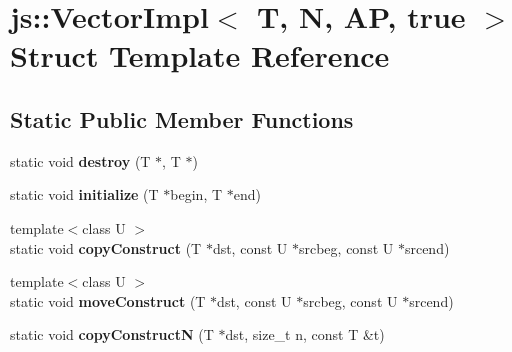 \hypertarget{structjs_1_1_vector_impl_3_01_t_00_01_n_00_01_a_p_00_01true_01_4}{\section{js\-:\-:Vector\-Impl$<$ T, N, A\-P, true $>$ Struct Template Reference}
\label{structjs_1_1_vector_impl_3_01_t_00_01_n_00_01_a_p_00_01true_01_4}
}
\subsection*{Static Public Member Functions}
\begin{DoxyCompactItemize}
\item 
\hypertarget{structjs_1_1_vector_impl_3_01_t_00_01_n_00_01_a_p_00_01true_01_4_a577c31b6f9adbd398ef9756cd1945482}{static void {\bfseries destroy} (T $\ast$, T $\ast$)}\label{structjs_1_1_vector_impl_3_01_t_00_01_n_00_01_a_p_00_01true_01_4_a577c31b6f9adbd398ef9756cd1945482}

\item 
\hypertarget{structjs_1_1_vector_impl_3_01_t_00_01_n_00_01_a_p_00_01true_01_4_af8c4b379a68282deb09405e1a3fcbe27}{static void {\bfseries initialize} (T $\ast$begin, T $\ast$end)}\label{structjs_1_1_vector_impl_3_01_t_00_01_n_00_01_a_p_00_01true_01_4_af8c4b379a68282deb09405e1a3fcbe27}

\item 
\hypertarget{structjs_1_1_vector_impl_3_01_t_00_01_n_00_01_a_p_00_01true_01_4_a380614a3aaa1e3cb23a2c6343d90dcc5}{{\footnotesize template$<$class U $>$ }\\static void {\bfseries copy\-Construct} (T $\ast$dst, const U $\ast$srcbeg, const U $\ast$srcend)}\label{structjs_1_1_vector_impl_3_01_t_00_01_n_00_01_a_p_00_01true_01_4_a380614a3aaa1e3cb23a2c6343d90dcc5}

\item 
\hypertarget{structjs_1_1_vector_impl_3_01_t_00_01_n_00_01_a_p_00_01true_01_4_a13d72042407d1e1bbbc80bb20aadd0ab}{{\footnotesize template$<$class U $>$ }\\static void {\bfseries move\-Construct} (T $\ast$dst, const U $\ast$srcbeg, const U $\ast$srcend)}\label{structjs_1_1_vector_impl_3_01_t_00_01_n_00_01_a_p_00_01true_01_4_a13d72042407d1e1bbbc80bb20aadd0ab}

\item 
\hypertarget{structjs_1_1_vector_impl_3_01_t_00_01_n_00_01_a_p_00_01true_01_4_a1e9cbf9e686058634877baaaaea68762}{static void {\bfseries copy\-Construct\-N} (T $\ast$dst, size\-\_\-t n, const T \&t)}\label{structjs_1_1_vector_impl_3_01_t_00_01_n_00_01_a_p_00_01true_01_4_a1e9cbf9e686058634877baaaaea68762}


\end{DoxyCompactItemize}
